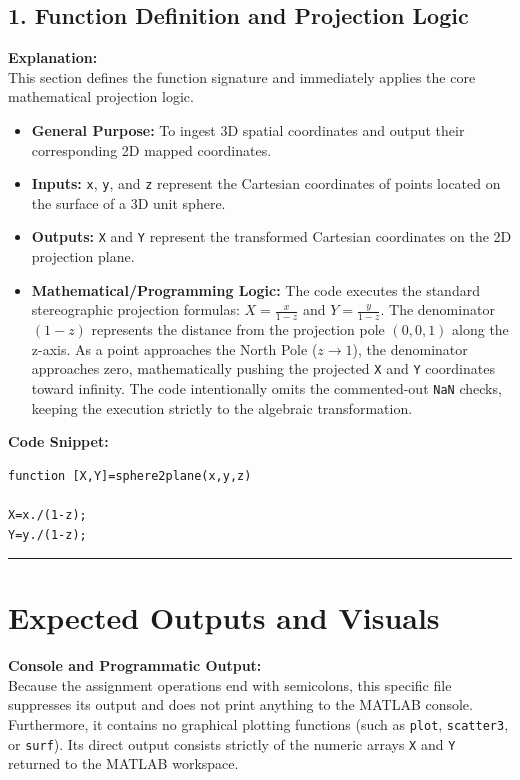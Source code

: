 \subsection{1. Function Definition and Projection Logic}

\textbf{Explanation:}\\
This section defines the function signature and immediately applies the core mathematical projection logic. 
\begin{itemize}
    \item \textbf{General Purpose:} To ingest 3D spatial coordinates and output their corresponding 2D mapped coordinates.
    \item \textbf{Inputs:} \texttt{x}, \texttt{y}, and \texttt{z} represent the Cartesian coordinates of points located on the surface of a 3D unit sphere.
    \item \textbf{Outputs:} \texttt{X} and \texttt{Y} represent the transformed Cartesian coordinates on the 2D projection plane.
    \item \textbf{Mathematical/Programming Logic:} The code executes the standard stereographic projection formulas: $X = \frac{x}{1-z}$ and $Y = \frac{y}{1-z}$. The denominator $(1-z)$ represents the distance from the projection pole $(0,0,1)$ along the z-axis. As a point approaches the North Pole ($z \to 1$), the denominator approaches zero, mathematically pushing the projected \texttt{X} and \texttt{Y} coordinates toward infinity. The code intentionally omits the commented-out \texttt{NaN} checks, keeping the execution strictly to the algebraic transformation.
\end{itemize}

\textbf{Code Snippet:}
\begin{lstlisting}
function [X,Y]=sphere2plane(x,y,z)

X=x./(1-z);
Y=y./(1-z);
\end{lstlisting}

\vspace{1em}
\hrule
\vspace{1em}

\section{Expected Outputs and Visuals}

\textbf{Console and Programmatic Output:}\\
Because the assignment operations end with semicolons, this specific file suppresses its output and does not print anything to the MATLAB console. Furthermore, it contains no graphical plotting functions (such as \texttt{plot}, \texttt{scatter3}, or \texttt{surf}). Its direct output consists strictly of the numeric arrays \texttt{X} and \texttt{Y} returned to the MATLAB workspace.

